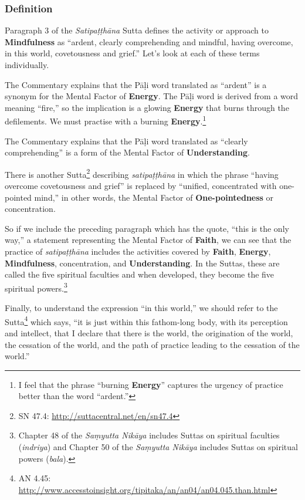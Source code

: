 \subsubsection*{Definition}

Paragraph 3 of the \textit{Satipaṭṭhāna} Sutta defines the activity or approach to \textbf{Mindfulness} as “ardent, clearly comprehending and mindful, having overcome, in this world, covetousness and grief.” Let’s look at each of these terms individually.

The Commentary explains that the Pāḷi word translated as “ardent” is a synonym for the Mental Factor of \textbf{Energy}. The Pāḷi word is derived from a word meaning “fire,” so the implication is a glowing \textbf{Energy} that burns through the defilements. We must practise with a burning \textbf{Energy}.\footnote{I feel that the phrase “burning \textbf{Energy}” captures the urgency of practice better than the word “ardent.”}

The Commentary explains that the Pāḷi word translated as “clearly comprehending” is a form of the Mental Factor of \textbf{Understanding}.

There is another Sutta\footnote{SN 47.4: \url{http://suttacentral.net/en/sn47.4}} describing \textit{satipaṭṭhāna} in which the phrase “having overcome covetousness and grief” is replaced by “unified, concentrated with one-pointed mind,” in other words, the Mental Factor of \textbf{One-pointedness} or concentration.

So if we include the preceding paragraph which has the quote, “this is the only way,” a statement representing the Mental Factor of \textbf{Faith}, we can see that the practice of \textit{satipaṭṭhāna} includes the activities covered by \textbf{Faith}, \textbf{Energy}, \textbf{Mindfulness}, concentration, and \textbf{Understanding}. In the Suttas, these are called the five spiritual faculties and when developed, they become the five spiritual powers.\footnote{Chapter 48 of the \textit{Saṃyutta Nikāya} includes Suttas on spiritual faculties (\textit{indriya}) and Chapter 50 of the \textit{Saṃyutta Nikāya} includes Suttas on spiritual powers (\textit{bala}).}

Finally, to understand the expression “in this world,” we should refer to the Sutta\footnote{AN 4.45: \url{http://www.accesstoinsight.org/tipitaka/an/an04/an04.045.than.html}} which says, “it is just within this fathom-long body, with its perception and intellect, that I declare that there is the world, the origination of the world, the cessation of the world, and the path of practice leading to the cessation of the world.”

